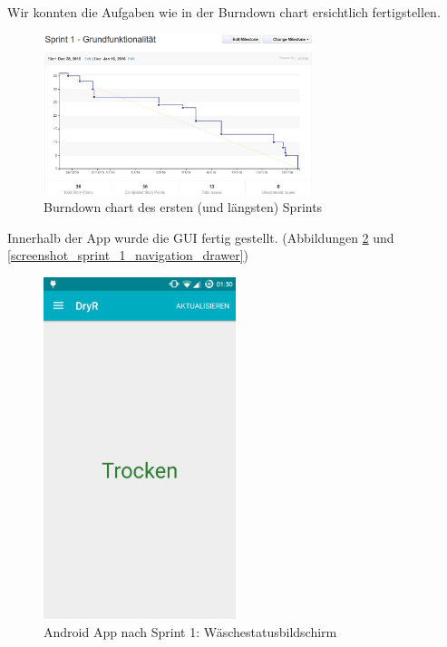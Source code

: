 Wir konnten die Aufgaben wie in der Burndown chart ersichtlich fertigstellen.
\begin{figure}[htb] 
	\centerline{\includegraphics[width=0.7\textwidth]{burndown_sprint1.jpg}}
	\caption{Burndown chart des ersten (und längsten) Sprints}
	\label{screenshot_sprint_1_burndown}
\end{figure}
Innerhalb der App wurde die GUI fertig gestellt. (Abbildungen \ref{screenshot_sprint_1_laundry_status} und \ref{screenshot_sprint_1_navigation_drawer})
\begin{figure}[htb] 
	\centerline{\includegraphics[width=0.5\textwidth]{laundry_status_dry.png}}
	\caption{Android App nach Sprint 1: Wäschestatusbildschirm}
	\label{screenshot_sprint_1_laundry_status}
\end{figure}
